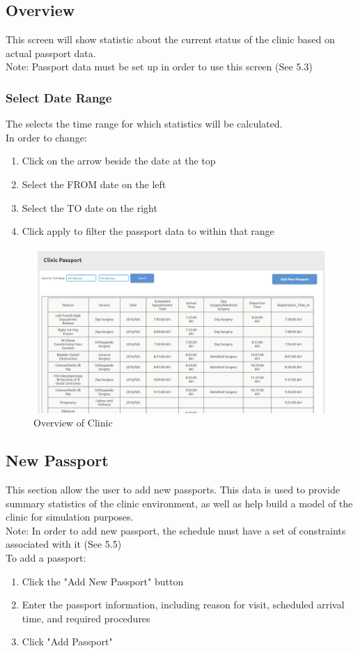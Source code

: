 \documentclass[12pt]{article}
\begin{document}
\subsection{Overview}
This screen will show statistic about the current status of the clinic based on actual passport data.\\

Note: Passport data must be set up in order to use this screen (See 5.3)

\subsubsection{Select Date Range}
The selects the time range for which statistics will be calculated.\\
In order to change:
\begin{enumerate}
\item Click on the arrow beside the date at the top
\item Select the FROM date on the left
\item Select the TO date on the right
\item Click apply to filter the passport data to within that range
\end{enumerate}

\begin{figure}[H]
\centering
\includegraphics[width=\textwidth]{passport}
\caption{Overview of Clinic}
\end{figure}

\subsection{New Passport}
This section allow the user to add new passports. This data is used to provide summary statistics of the clinic environment, as well as help build a model of the clinic for simulation purposes. \\ \newline
Note: In order to add new passport, the schedule must have a set of constraints associated with it (See 5.5) \\
To add a passport:
\begin{enumerate}
\item Click the "Add New Passport" button
\item Enter the passport information, including reason for visit, scheduled arrival time, and required procedures
\item Click "Add Passport"
\end{enumerate}
\end{document}
